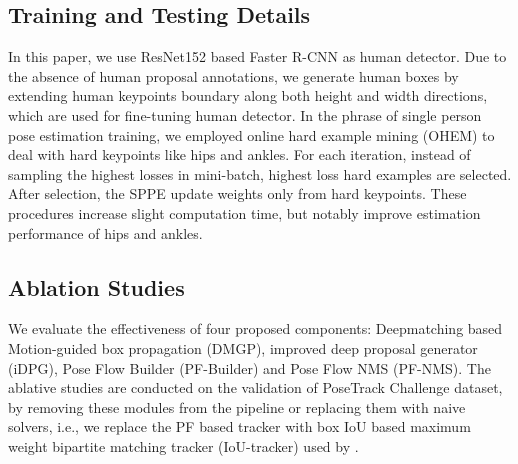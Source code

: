 \documentclass{bmvc2k}
\begin{document}
\subsection{Training and Testing Details}
In this paper, we use ResNet152 based Faster R-CNN as human detector. Due to the absence of human proposal annotations, we generate human boxes by extending human keypoints boundary  along both height and width directions, which are used for fine-tuning human detector. In the phrase of single person pose estimation training, we employed online hard example mining (OHEM) to deal with hard keypoints like hips and ankles. For each iteration, instead of sampling the highest  losses in mini-batch,  highest loss hard examples are selected. After selection, the SPPE update weights only from hard keypoints. These procedures increase slight computation time, but notably improve estimation performance of hips and ankles.

\subsection{Ablation Studies}
We evaluate the effectiveness of four proposed components: Deepmatching based Motion-guided box propagation (DMGP), improved deep proposal generator (iDPG), Pose Flow Builder (PF-Builder) and Pose Flow NMS (PF-NMS). The ablative studies are conducted on the validation of PoseTrack Challenge dataset, by removing these modules from the pipeline or replacing them with naive solvers, i.e., we replace the PF based tracker with box IoU based maximum weight bipartite matching tracker (IoU-tracker) used by \cite{girdhar2017detect}.

\vspace{-2mm}
\begin{table}[!ht]
\centering
{}
\vspace{4mm}
\caption{Ablation comparison. ``IoU-Tracker'' means naive box IoU based matching tracker used by \cite{girdhar2017detect}. ``w/o PF-NMS'' means only using PF-Builder without PF-NMS. ``w/o DMGP'' means removing motion-guided box propagation. ``w/o iDPG'' means without improved deep proposal generator.}
\label{Ablation}
\end{table}
\vspace{-2mm}
\end{document}
